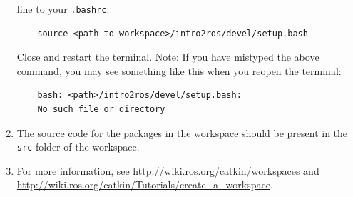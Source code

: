 \documentclass{article}
\begin{document}
\begin{enumerate}
        line to your \texttt{.bashrc}:
        \begin{verbatim}
    source <path-to-workspace>/intro2ros/devel/setup.bash
        \end{verbatim}
        Close and restart the terminal.
        Note: If you have mistyped the above command, you may see something like this
        when you reopen the terminal:
        \begin{verbatim}
    bash: <path>/intro2ros/devel/setup.bash:
    No such file or directory
        \end{verbatim}
        \item The source code for the packages in the workspace should be present in the
        \texttt{src} folder of the workspace.
        \item For more information, see \url{http://wiki.ros.org/catkin/workspaces} and
        \url{http://wiki.ros.org/catkin/Tutorials/create_a_workspace}.
    \end{enumerate}
\end{document}
